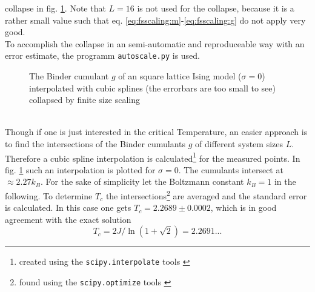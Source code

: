     collapse in fig. \ref{fig:gettingCrit}.
    Note that \(L=16\) is not used for the collapse, because it is a
    rather small value such that eq. \eqref{eq:fsscaling:m}-\eqref{eq:fsscaling:g}
    do not apply very good.\\
    To accomplish the collapse in an semi-automatic and reproduceable
    way with an error estimate, the programm
    \texttt{autoscale.py} \cite{autoscale2009} is used.
    \begin{figure}[htbp]
        \centering
        \caption[Examples of determining critical temperature and exponents]
        {
            The Binder cumulant \(g\) of an square lattice Ising model
            (\(\sigma=0\))\\
             interpolated
                with cubic splines (the errorbars are too small to see)\\
             collapsed by finite
                size scaling
        }
        \label{fig:gettingCrit}
    \end{figure}\\
    Though if one is just interested in the critical Temperature, an
    easier approach is to find the intersections of the Binder cumulants
    \(g\) of different system sizes \(L\).
    Therefore a cubic spline interpolation is calculated\footnote{created using the \texttt{scipy.interpolate} tools \cite{scipy2001}}
    for the measured points.
    In fig. \ref{fig:gettingCrit}
    such an interpolation is plotted for \(\sigma=0\). The cumulants
    intersect at \(\approx 2.27 k_{B}\). For the sake of simplicity let
    the Boltzmann constant \(k_{B}=1\) in the following.
    To determine \(T_c\) the intersections\footnote{found using the \texttt{scipy.optimize} tools \cite{scipy2001}}
    are averaged and the standard error is calculated. In this case one
    gets \(T_c = 2.2689\pm0.0002\), which is in good agreement with the
    exact solution \cite{Onsager1944}
    \begin{equation}
        T_c = 2J/\ln(1+\sqrt 2) = 2.2691...
        \label{eq:exactTc}
    \end{equation}

